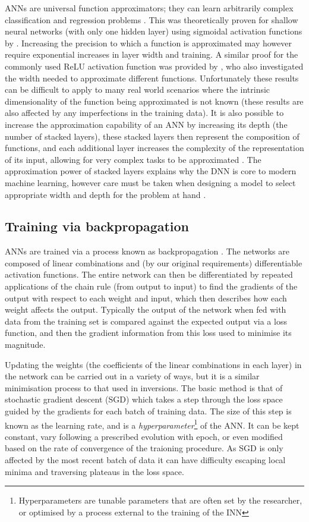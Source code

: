 ANNs are universal function approximators; they can learn arbitrarily complex classification and regression problems \citep{Rumelhart1986,1989Cybenko}.
This was theoretically proven for shallow neural networks (with only one hidden layer) using sigmoidal activation functions by \citet{1989Cybenko}.
Increasing the precision to which a function is approximated may however require exponential increases in layer width and training.
A similar proof for the commonly used ReLU activation function was provided by \citet{Lu2017}, who also investigated the width needed to approximate different functions.
Unfortunately these results can be difficult to apply to many real world scenarios where the intrinsic dimensionality of the function being approximated is not known (these results are also affected by any imperfections in the training data).
It is also possible to increase the approximation capability of an ANN by increasing its depth (the number of stacked layers), these stacked layers then represent the composition of functions, and each additional layer increases the complexity of the representation of its input, allowing for very complex tasks to be approximated \citep{Raschka2015}.
The approximation power of stacked layers explains why the DNN is core to modern machine learning, however care must be taken when designing a model to select appropriate width and depth for the problem at hand \citep{Lu2017}.

\subsection{Training via backpropagation}

ANNs are trained via a process known as backpropagation \citep{Rumelhart1986}.
The networks are composed of linear combinations and (by our original requirements) differentiable activation functions.
The entire network can then be differentiated by repeated applications of the chain rule (from output to input) to find the gradients of the output with respect to each weight and input, which then describes how each weight affects the output.
Typically the output of the network when fed with data from the training set is compared against the expected output via a loss function, and then the gradient information from this loss used to minimise its magnitude.

Updating the weights (the coefficients of the linear combinations in each layer) in the network can be carried out in a variety of ways, but it is a similar minimisation process to that used in inversions.
The basic method is that of stochastic gradient descent (SGD) which takes a step through the loss space guided by the gradients for each batch of training data.
The size of this step is known as the learning rate, and is a \emph{hyperparameter}\footnote{Hyperparameters are tunable parameters that are often set by the researcher, or optimised by a process external to the training of the INN} of the ANN.
It can be kept constant, vary following a prescribed evolution with epoch, or even modified based on the rate of convergence of the traioning procedure.
As SGD is only affected by the most recent batch of data it can have difficulty escaping local minima and traversing plateaus in the loss space.

